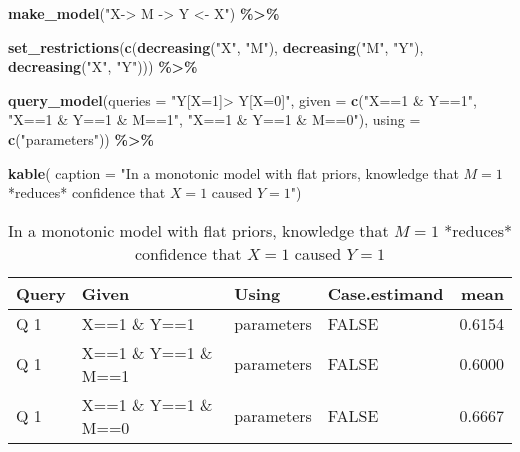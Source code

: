 \documentclass[
  12pt,
]{book}
\newenvironment{Shaded}{\begin{snugshade}}{\end{snugshade}}
\newcommand{\AttributeTok}[1]{\textcolor[rgb]{0.13,0.29,0.53}{#1}}
\newcommand{\FunctionTok}[1]{\textcolor[rgb]{0.13,0.29,0.53}{\textbf{#1}}}
\newcommand{\NormalTok}[1]{#1}
\newcommand{\SpecialCharTok}[1]{\textcolor[rgb]{0.81,0.36,0.00}{\textbf{#1}}}
\newcommand{\StringTok}[1]{\textcolor[rgb]{0.31,0.60,0.02}{#1}}
\begin{document}
\begin{Shaded}
\begin{Highlighting}[]
\FunctionTok{make\_model}\NormalTok{(}\StringTok{"X{-}\textgreater{} M {-}\textgreater{} Y \textless{}{-} X"}\NormalTok{) }\SpecialCharTok{\%\textgreater{}\%} 
  
  \FunctionTok{set\_restrictions}\NormalTok{(}\FunctionTok{c}\NormalTok{(}\FunctionTok{decreasing}\NormalTok{(}\StringTok{"X"}\NormalTok{, }\StringTok{"M"}\NormalTok{), }
                     \FunctionTok{decreasing}\NormalTok{(}\StringTok{"M"}\NormalTok{, }\StringTok{"Y"}\NormalTok{), }
                     \FunctionTok{decreasing}\NormalTok{(}\StringTok{"X"}\NormalTok{, }\StringTok{"Y"}\NormalTok{))) }\SpecialCharTok{\%\textgreater{}\%}
  
  \FunctionTok{query\_model}\NormalTok{(}\AttributeTok{queries =} \StringTok{"Y[X=1]\textgreater{} Y[X=0]"}\NormalTok{,}
              \AttributeTok{given =} \FunctionTok{c}\NormalTok{(}\StringTok{"X==1 \& Y==1"}\NormalTok{, }
                        \StringTok{"X==1 \& Y==1 \& M==1"}\NormalTok{, }
                        \StringTok{"X==1 \& Y==1 \& M==0"}\NormalTok{),}
              \AttributeTok{using =} \FunctionTok{c}\NormalTok{(}\StringTok{"parameters"}\NormalTok{)) }\SpecialCharTok{\%\textgreater{}\%}
  
  \FunctionTok{kable}\NormalTok{(}
    \AttributeTok{caption =} \StringTok{"In a monotonic model with flat priors, knowledge}
\StringTok{    that $M=1$ *reduces* confidence that $X=1$ caused $Y=1$"}\NormalTok{)}
\end{Highlighting}
\end{Shaded}

\begin{table}

\caption{\label{tab:unnamed-chunk-43}In a monotonic model with flat priors, knowledge
    that $M=1$ *reduces* confidence that $X=1$ caused $Y=1$}
\centering
\begin{tabular}[t]{l|l|l|l|r}
\hline
Query & Given & Using & Case.estimand & mean\\
\hline
Q 1 & X==1 \& Y==1 & parameters & FALSE & 0.6154\\
\hline
Q 1 & X==1 \& Y==1 \& M==1 & parameters & FALSE & 0.6000\\
\hline
Q 1 & X==1 \& Y==1 \& M==0 & parameters & FALSE & 0.6667\\
\hline
\end{tabular}
\end{table}
\end{document}
